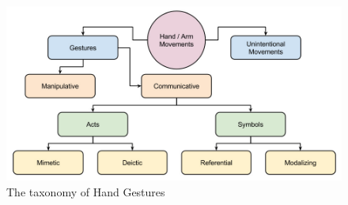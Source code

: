 \begin{figure}
	[h] \centering 
	\includegraphics[width=120mm]{figures/content/ges-tax.jpg} \caption{The taxonomy of Hand Gestures \cite{1}} \label{fg:ges:tax} 
\end{figure}
